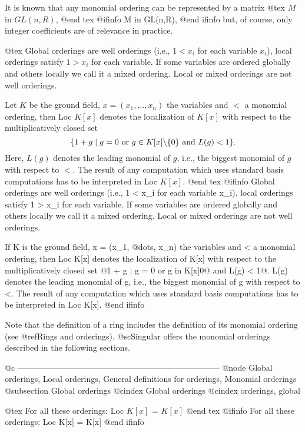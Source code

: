 It is known that any monomial ordering can be represented by a matrix 
@tex
$M$ in $GL(n,R)$,
@end tex
@ifinfo
M in GL(n,R),
@end ifinfo
but, of course, only integer coefficients are of relevance in
practice.

@tex
Global orderings are well orderings (i.e.,  \hbox{$1 < x_i$} for each variable
$x_i$), local orderings satisfy $1 > x_i$ for each variable.   If some variables are ordered globally and others locally we
call it a mixed ordering.   Local or mixed orderings are not well orderings.

Let $K$ be the ground field, \hbox{$x = (x_1, \ldots, x_n)$} the
variables and $<$ a monomial ordering, then Loc $K[x]$ denotes the
localization of $K[x]$ with respect to the multiplicatively closed set $$\{1 +
g \mid g = 0 \hbox{ or } g \in K[x]\backslash \{0\} \hbox{ and }L(g) <
1\}.$$   Here, $L(g)$ 
denotes the leading monomial of $g$, i.e., the biggest monomial of $g$ with
respect to $<$.   The result of any computation which uses standard basis
computations has to be interpreted in Loc $K[x]$.
@end tex
@ifinfo
Global orderings are well orderings (i.e., 1 < x_i for each variable
x_i), local orderings satisfy 1 > x_i for each variable.
If some variables are ordered globally and others locally we
call it a mixed ordering.   Local or mixed orderings are not well orderings.

If K is the ground field, x = (x_1, @dots{}, x_n) the
variables and < a monomial ordering, then Loc K[x] denotes the
localization of K[x] with respect to the multiplicatively closed set @{1 +
g | g = 0 or g in K[x]\@{0@} and L(g) < 1@}.   L(g)
denotes the leading monomial of g, i.e., the biggest monomial of g with
respect to <.   The result of any computation which uses standard basis
computations has to be interpreted in Loc K[x].
@end ifinfo

Note that the definition of a ring includes the definition of its
monomial ordering (see 
@ref{Rings and orderings}). @sc{Singular} offers the monomial orderings
described in the following sections. 


@c --------------------------------------------------------------------------
@node Global orderings, Local orderings, General definitions for orderings, Monomial orderings
@subsection Global orderings
@cindex Global orderings
@cindex orderings, global

@tex
For all these orderings: Loc $K[x]$ = $K[x]$
@end tex
@ifinfo
For all these orderings: Loc K[x] = K[x]
@end ifinfo

